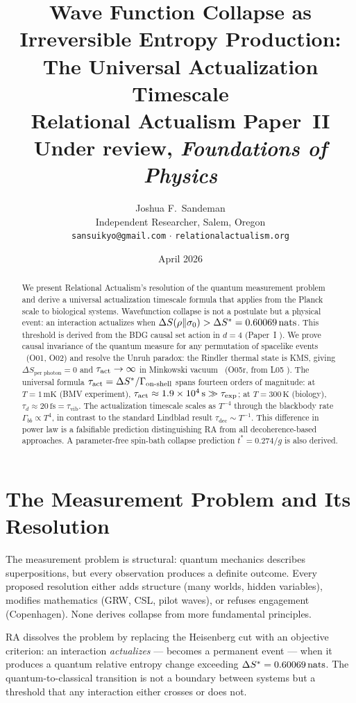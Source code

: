 \documentclass[12pt,a4paper]{article}
\title{\textbf{Wave Function Collapse as Irreversible Entropy Production:\\
The Universal Actualization Timescale}\\[0.4em]
\large\normalfont Relational Actualism Paper~II\\
\normalsize Under review, \textit{Foundations of Physics}}
\author{Joshua F.~Sandeman\\[0.3em]
\small Independent Researcher, Salem, Oregon\\
\small \texttt{sansuikyo@gmail.com} $\cdot$ \texttt{relationalactualism.org}}
\date{April 2026}
\begin{document}
\maketitle
\begin{abstract}
We present Relational Actualism's resolution of the quantum measurement problem and derive a universal actualization timescale formula that applies from the Planck scale to biological systems.  Wavefunction collapse is not a postulate but a physical event: an interaction actualizes when $\Delta S(\rho\|\sigma_0) > \Delta S^* = 0.60069\,\mathrm{nats}$.  This threshold is derived from the BDG causal set action in $d=4$ (Paper~I \cite{RA_P1}).  We prove causal invariance of the quantum measure for any permutation of spacelike events \statusLV\ (O01, O02) and resolve the Unruh paradox: the Rindler thermal state is KMS, giving $\Delta S_{\mathrm{per\;photon}} = 0$ and $\tau_{\mathrm{act}} \to \infty$ in Minkowski vacuum \statusDR\ (O05r, from L05 \statusLV).  The universal formula $\tau_{\mathrm{act}} = \Delta S^* / \Gamma_{\mathrm{on\text{-}shell}}$ spans fourteen orders of magnitude: at $T=1\,\mathrm{mK}$ (BMV experiment), $\tau_{\mathrm{act}} \approx 1.9\times10^4\,\mathrm{s} \gg \tau_{\mathrm{exp}}$; at $T=300\,\mathrm{K}$ (biology), $\tau_d \approx 20\,\mathrm{fs} = \tau_{\mathrm{vib}}$.  The actualization timescale scales as $T^{-4}$ through the blackbody rate $\Gamma_{bb}\propto T^4$, in contrast to the standard Lindblad result $\tau_{\mathrm{dec}} \sim T^{-1}$.  This difference in power law is a falsifiable prediction distinguishing RA from all decoherence-based approaches.  A parameter-free spin-bath collapse prediction $t^* = 0.274/g$ is also derived.
\end{abstract}

\tableofcontents

\section{The Measurement Problem and Its Resolution}

The measurement problem is structural: quantum mechanics describes superpositions, but every observation produces a definite outcome.  Every proposed resolution either adds structure (many worlds, hidden variables), modifies mathematics (GRW, CSL, pilot waves), or refuses engagement (Copenhagen).  None derives collapse from more fundamental principles.

RA dissolves the problem by replacing the Heisenberg cut with an objective criterion: an interaction \emph{actualizes} — becomes a permanent event — when it produces a quantum relative entropy change exceeding $\Delta S^* = 0.60069\,\mathrm{nats}$.  The quantum-to-classical transition is not a boundary between systems but a threshold that any interaction either crosses or does not.
\end{document}
